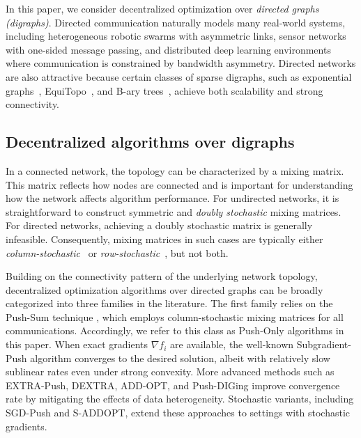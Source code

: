 \documentclass[10pt]{article}
\newcommand{\pushsum}{{\sc Push-Sum}\xspace}
\newcommand{\pushonly}{{\sc Push-Only}\xspace}
\newcommand{\pushdg}{{\sc Push-DIGing}\xspace}
\newcommand{\extrapush}{{\sc EXTRA-Push}\xspace}
\newcommand{\dextra}{{\sc DEXTRA}\xspace}
\newcommand{\addopt}{{\sc ADD-OPT}\xspace}
\newcommand{\saddopt}{{\sc S-ADDOPT}\xspace}
\newcommand{\subpush}{{\sc Subgradient-Push}\xspace}
\newcommand{\sgdpush}{{\sc SGD-Push}\xspace}
\begin{document}
In this paper, we consider decentralized optimization over \emph{directed graphs (digraphs)}. Directed communication naturally models many real-world systems, including heterogeneous robotic swarms with asymmetric links, sensor networks with one-sided message passing, and distributed deep learning environments where communication is constrained by bandwidth asymmetry. Directed networks are also attractive because certain classes of sparse digraphs, such as exponential graphs~\cite{assran2019stochastic}, EquiTopo~\cite{song2022communication}, and B-ary trees~\cite{you2024bary}, achieve both scalability and strong connectivity.  

\subsection{Decentralized algorithms over digraphs} In a connected network, the topology can be characterized by a mixing matrix. This matrix reflects how nodes are connected and is important for understanding how the network affects algorithm performance. For undirected networks, it is straightforward to construct symmetric and \textit{doubly stochastic} mixing matrices. For directed networks, achieving a doubly stochastic matrix is generally infeasible. Consequently, mixing matrices in such cases are typically either \textit{column-stochastic}~\cite{Olshevsky2015Dist, Nedic2017pushdiging} or \textit{row-stochastic}~\cite{sayed2014adaptive, mai2016distributed}, but not both.

Building on the connectivity pattern of the underlying network topology, decentralized optimization algorithms over directed graphs can be broadly categorized into three families in the literature. The first family relies on the \pushsum technique \cite{kempe2003gossip, tsianos2012push}, which employs column-stochastic mixing matrices for all communications. Accordingly, we refer to this class as \pushonly algorithms in this paper. When exact gradients $\nabla f_i$ are available, the well-known \subpush algorithm \cite{Olshevsky2015Dist, tsianos2012push} converges to the desired solution, albeit with relatively slow sublinear rates even under strong convexity. More advanced methods such as \extrapush \cite{zeng2017extrapush}, \dextra \cite{xi2017dextra}, \addopt \cite{xi2017add}, and \pushdg \cite{Nedic2017pushdiging} improve convergence rate by mitigating the effects of data heterogeneity. Stochastic variants, including \sgdpush \cite{assran2019stochastic} and \saddopt \cite{qureshi2020s}, extend these approaches to settings with stochastic gradients.
\end{document}
